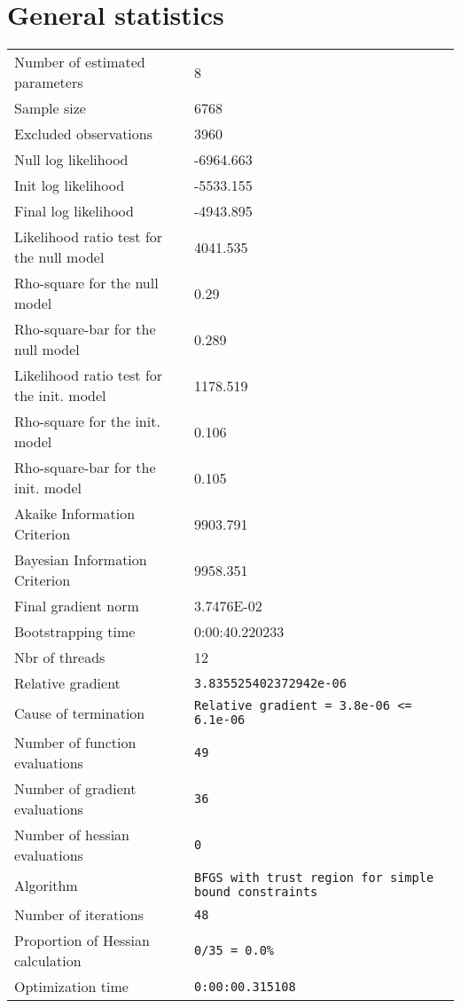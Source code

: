 \section{General statistics}
\begin{tabular}{ll}
Number of estimated parameters & 8 \\
Sample size & 6768 \\
Excluded observations & 3960 \\
Null log likelihood & -6964.663 \\
Init log likelihood & -5533.155 \\
Final log likelihood & -4943.895 \\
Likelihood ratio test for the null model & 4041.535 \\
Rho-square for the null model & 0.29 \\
Rho-square-bar for the null model & 0.289 \\
Likelihood ratio test for the init. model & 1178.519 \\
Rho-square for the init. model & 0.106 \\
Rho-square-bar for the init. model & 0.105 \\
Akaike Information Criterion & 9903.791 \\
Bayesian Information Criterion & 9958.351 \\
Final gradient norm & 3.7476E-02 \\
Bootstrapping time & 0:00:40.220233 \\
Nbr of threads & 12 \\
Relative gradient & \verb$3.835525402372942e-06$ \\
Cause of termination & \verb$Relative gradient = 3.8e-06 <= 6.1e-06$ \\
Number of function evaluations & \verb$49$ \\
Number of gradient evaluations & \verb$36$ \\
Number of hessian evaluations & \verb$0$ \\
Algorithm & \verb$BFGS with trust region for simple bound constraints$ \\
Number of iterations & \verb$48$ \\
Proportion of Hessian calculation & \verb$0/35 = 0.0%$ \\
Optimization time & \verb$0:00:00.315108$ \\
\end{tabular}

